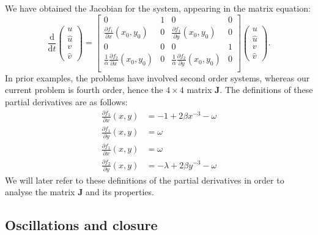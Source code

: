 \documentclass{article}
\begin{document}
We have obtained the Jacobian for the system, appearing in the matrix equation:
\begin{equation}
    \frac{\mathrm{d}}{\mathrm{d}t} \begin{pmatrix}
        u \\
        \hat{u} \\
        v \\
        \hat{v}
    \end{pmatrix} = \begin{bmatrix}
        0 & 1 & 0 & 0 \\
        \frac{\partial f_1}{\partial x}(x_0,y_0) & 0 & \frac{\partial f_1}{\partial y}(x_0,y_0) & 0 \\
        0 & 0 & 0 & 1 \\
        \frac{1}{\alpha}\frac{\partial f_2}{\partial x}(x_0,y_0) & 0 & \frac{1}{\alpha}\frac{\partial f_2}{\partial y}(x_0,y_0) & 0 \\
    \end{bmatrix} \begin{pmatrix}
        u \\
        \hat{u} \\
        v \\
        \hat{v}
    \end{pmatrix}.
    \label{eqn:twomass_matrix_jacobian_quad}
\end{equation}
In prior examples, the problems have involved second order systems,
whereas our current problem is fourth order,
hence the \(4\times4\) matrix \(\mathbf{J}\).
The definitions of these partial derivatives are as follows:
\begin{equation}
    \begin{aligned}
        \frac{\partial f_1}{\partial x}(x,y) &= -1 + 2\beta x^{-3} - \omega \\
        \frac{\partial f_1}{\partial y}(x,y) &= \omega \\
        \frac{\partial f_1}{\partial x}(x,y) &= \omega \\
        \frac{\partial f_2}{\partial y}(x,y) &= -\lambda +2\beta y^{-3} - \omega
    \end{aligned}
    \label{eqn:twomass_partial_derivatives}
\end{equation}
We will later refer to these definitions of the partial derivatives in order to analyse the matrix $\mathbf{J}$ and its properties.






\subsection{Oscillations and closure}
\end{document}
